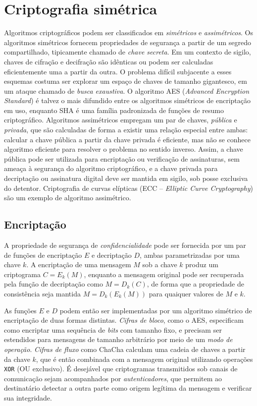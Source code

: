 \section{Criptografia simétrica}

Algoritmos criptográficos podem ser classificados em \emph{simétricos} e \emph{assimétricos}. Os algoritmos simétricos fornecem propriedades de segurança a partir de um segredo compartilhado, tipicamente chamado de \emph{chave secreta}. Em um contexto de sigilo, chaves de cifração e decifração são idênticas ou podem ser calculadas eficientemente uma a partir da outra. O problema difícil subjacente a esses esquemas costuma ser explorar um espaço de chaves de tamanho gigantesco, em um ataque chamado de \emph{busca exaustiva}. O algoritmo AES (\emph{Advanced Encryption Standard}) é talvez o mais difundido entre os algoritmos simétricos de encriptação em uso, enquanto SHA é uma família padronizada de funções de resumo criptográfico. Algoritmos assimétricos empregam um par de chaves, \emph{pública} e \emph{privada}, que são calculadas de forma a existir uma relação especial entre ambas: calcular a chave pública a partir da chave privada é eficiente, mas não se conhece algoritmo eficiente para resolver o problema no sentido inverso. Assim, a chave pública pode ser utilizada para encriptação ou verificação de assinaturas, sem ameaça à segurança do algoritmo criptográfico, e a chave privada para decriptação ou assinatura digital deve ser mantida em sigilo, sob posse exclusiva do detentor. Criptografia de curvas elípticas (ECC -- \emph{Elliptic Curve Cryptography}) são um exemplo de algoritmo assimétrico.

\subsection{Encriptação}

A propriedade de segurança de \emph{confidencialidade} pode ser fornecida por um par de funções de encriptação $E$ e decriptação $D$, ambas parametrizadas por uma chave $k$. A encriptação de uma mensagem $M$ sob a chave $k$ produz um criptograma $C = E_k(M)$, enquanto a mensagem original pode ser recuperada pela função de decriptação como $M = D_k(C)$, de forma que a propriedade de consistência seja mantida $M = D_k(E_k(M))$ para quaiquer valores de $M$ e $k$.

As funções $E$ e $D$ podem então ser implementadas por um algoritmo simétrico de encriptação de duas formas distintas. \emph{Cifras de bloco}, como o AES, especificam como encriptar uma sequência de \emph{bits} com tamanho fixo, e precisam ser estendidos para mensagens de tamanho arbitrário por meio de um \emph{modo de operação}. \emph{Cifras de fluxo} como ChaCha calculam uma cadeia de chaves a partir da chave $k$, que é então combinada com a mensagem original utilizando operações \texttt{XOR} (OU exclusivo). É desejável que criptogramas transmitidos sob canais de comunicação sejam acompanhados por \emph{autenticadores}, que permitem ao destinatário detectar a outra parte como origem legítima da mensagem e verificar sua integridade.

